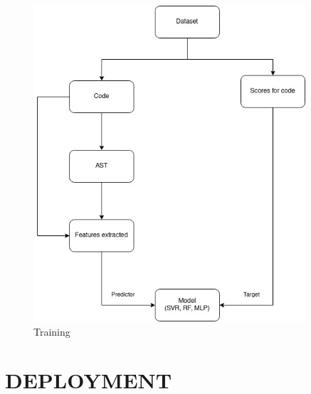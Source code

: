 \begin{figure}[h]
\centering
\includegraphics[width=0.9\textwidth]{./training.jpg}
\caption{Training}
\label{fig1}
\end{figure}

\newpage

\section{DEPLOYMENT} 

